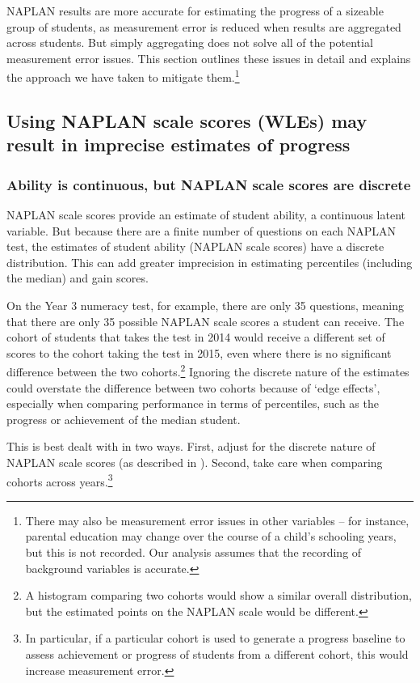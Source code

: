 NAPLAN results are more accurate for estimating the progress of a sizeable group of students, as measurement error is reduced when results are aggregated across students. But simply aggregating does not solve all of the potential measurement error issues. This section outlines these issues in detail and explains the approach we have taken to mitigate them.\footnote{There may also be measurement error issues in other variables -- for instance, parental education may change over the course of a child's schooling years, but this is not recorded. Our analysis assumes that the recording of background variables is accurate.}

\subsection{Using NAPLAN scale scores (WLEs) may result in imprecise estimates of progress}

\subsubsection*{Ability is continuous, but NAPLAN scale scores are discrete}

NAPLAN scale scores provide an estimate of student ability, a continuous latent variable. But because there are a finite number of questions on each NAPLAN test, the estimates of student ability (NAPLAN scale scores) have a discrete distribution. This can add greater imprecision in estimating percentiles (including the median) and gain scores.

On the Year 3 numeracy test, for example, there are only 35 questions, meaning that there are only 35 possible NAPLAN scale scores a student can receive. The cohort of students that takes the test in 2014 would receive a different set of scores to the cohort taking the test in 2015, even where there is no significant difference between the two cohorts.\footnote{A histogram comparing two cohorts would show a similar overall distribution, but the estimated points on the NAPLAN scale would be different.} Ignoring the discrete nature of the estimates could overstate the difference between two cohorts because of `edge effects', especially when comparing performance in terms of percentiles, such as the progress or achievement of the median student.

This is best dealt with in two ways. First, adjust for the discrete nature of NAPLAN scale scores (as described in ). Second, take care when comparing cohorts across years.\footnote{In particular, if a particular cohort is used to generate a progress baseline to assess achievement or progress of students from a different cohort, this would increase measurement error.}

